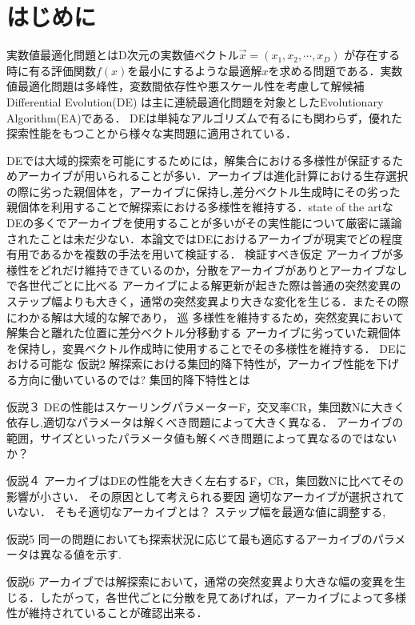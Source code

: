 \documentclass[originalpaper]{jpnsecart}      %
\author{%
 \name{山村}{武史}{Yamamura Takefumi}
 \affiliation{東京大学　教養学部　学際科学科総合情報学コース}%
     {The Department of Interdisciply Sciences, The University of Tokyo}%
     {yama1223xxx@gmail.com, http://www.ids.c.u-tokyo.ac.jp/info/}
\and
 \name{福永}{アレックス}{Fukunaga Alex}
 \affiliation{東京大学大学院総合文化研究科 広域科学専攻 広域システム科学系 }%
     { Department of General Systems Studies, Graduate School of Arts and Sciences, The University of Tokyo}%
     {fukunaga@idea.c.u-tokyo.ac.jp, http://metahack.org/index-j.html}
}
\begin{document}
\maketitle

\section{はじめに}
実数値最適化問題とはD次元の実数値ベクトル$\vec{x} = (x_1, x_2, \cdots, x_D)$ が存在する時に有る評価関数${f(x)}$を最小にするような最適解$x$を求める問題である．実数値最適化問題は多峰性，変数間依存性や悪スケール性を考慮して解候補	
Differential Evolution(DE) は主に連続最適化問題を対象としたEvolutionary Algorithm(EA)である．
DEは単純なアルゴリズムで有るにも関わらず，優れた探索性能をもつことから様々な実問題に適用されている．

DEでは大域的探索を可能にするためには，解集合における多様性が保証するためアーカイブが用いられることが多い．アーカイブは進化計算における生存選択の際に劣った親個体を，アーカイブに保持し,差分ベクトル生成時にその劣った親個体を利用することで解探索における多様性を維持する．state of the artなDEの多くでアーカイブを使用することが多いがその実性能について厳密に議論されたことは未だ少ない．本論文ではDEにおけるアーカイブが現実でどの程度有用であるかを複数の手法を用いて検証する．
検証すべき仮定
アーカイブが多様性をどれだけ維持できているのか，分散をアーカイブがありとアーカイブなしで各世代ごとに比べる
アーカイブによる解更新が起きた際は普通の突然変異のステップ幅よりも大きく，通常の突然変異より大きな変化を生じる．またその際にわかる解は大域的な解であり，
巡
多様性を維持するため，突然変異において解集合と離れた位置に差分ベクトル分移動する
アーカイブに劣っていた親個体を保持し，変異ベクトル作成時に使用することでその多様性を維持する．
DEにおける可能な
仮説2
解探索における集団的降下特性が，アーカイブ性能を下げる方向に働いているのでは?
集団的降下特性とは

仮説３
DEの性能はスケーリングパラメーターF，交叉率CR，集団数Nに大きく依存し,適切なパラメータは解くべき問題によって大きく異なる．
アーカイブの範囲，サイズといったパラメータ値も解くべき問題によって異なるのではないか？

仮説４
アーカイブはDEの性能を大きく左右するF，CR，集団数Nに比べてその影響が小さい．
その原因として考えられる要因
適切なアーカイブが選択されていない．
そもそ適切なアーカイブとは？
ステップ幅を最適な値に調整する,

仮説5
同一の問題においても探索状況に応じて最も適応するアーカイブのパラメータは異なる値を示す.

仮説6
アーカイブでは解探索において，通常の突然変異より大きな幅の変異を生じる．したがって，各世代ごとに分散を見てあげれば，アーカイブによって多様性が維持されていることが確認出来る．
\end{document}
